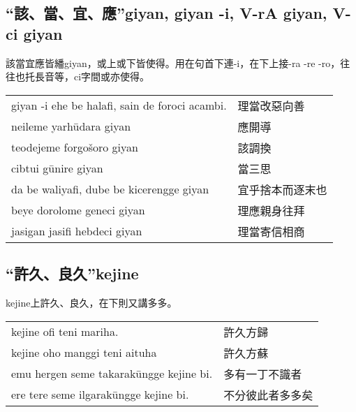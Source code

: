 \documentclass{article}
\begin{document}
\subsection{“該、當、宜、應”giyan, giyan -i, V-rA giyan, V-ci giyan}
\noindent 該當宜應皆繙giyan，或上或下皆使得。用在句首下連-i，在下上接-ra -re -ro，往往也托長音等，ci字間或亦使得。
\begin{center}
    \begin{tabularx}{\textwidth}{XX}
        giyan -i ehe be halafi, sain de foroci acambi. & 理當改惡向善\\
        neileme yarh\={u}dara giyan & 應開導\\
        teodejeme forgo\v{s}oro giyan & 該調換\\
        cibtui g\={u}nire giyan & 當三思\\
        da be waliyafi, dube be kicerengge giyan & 宜乎捨本而逐末也\\
        beye dorolome geneci giyan & 理應親身往拜\\
        jasigan jasifi hebdeci giyan & 理當寄信相商
    \end{tabularx}
\end{center}

\subsection{“許久、良久”kejine}
\noindent kejine上許久、良久，在下則又講多多。
\begin{center}
    \begin{tabularx}{\textwidth}{XX}
        kejine ofi teni mariha. & 許久方歸\\
        kejine oho manggi teni aituha &許久方蘇\\
        emu hergen seme takarak\={u}ngge kejine bi. & 多有一丁不識者\\
        ere tere seme ilgarak\={u}ngge kejine bi. & 不分彼此者多多矣
    \end{tabularx}
\end{center}
\end{document}
